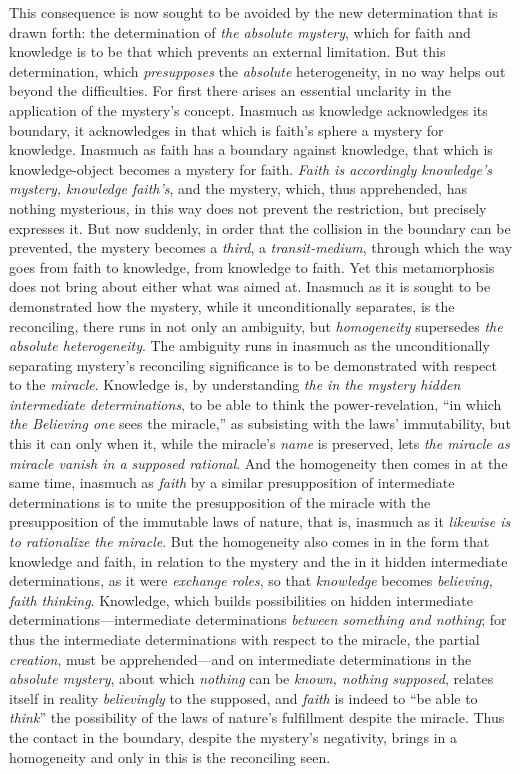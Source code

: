 \documentclass[12pt,a4paper]{book}
\begin{document}
This consequence is now sought to be avoided by the new determination that is drawn forth: the determination
of \emph{the absolute mystery}, which for faith and knowledge is to be that which prevents an external
limitation. But this determination, which \emph{presupposes} the \emph{absolute} heterogeneity, in no way helps out
beyond the difficulties. For first there arises an essential unclarity in the application of the mystery's
concept. Inasmuch as knowledge acknowledges its boundary, it acknowledges in that which is faith's sphere a
mystery for knowledge. Inasmuch as faith has a boundary against knowledge, that which is knowledge-object
becomes a mystery for faith. \emph{Faith is accordingly knowledge's mystery, knowledge faith's}, and the
mystery, which, thus apprehended, has nothing mysterious, in this way does not prevent the restriction, but
precisely expresses it. But now suddenly, in order that the collision in the boundary can be prevented, the
mystery becomes a \emph{third}, a \emph{transit-medium}, through which the way goes from faith to knowledge, from
knowledge to faith. Yet this metamorphosis does not bring about either what was aimed at. Inasmuch as it is
sought to be demonstrated how the mystery, while it unconditionally separates, is the reconciling, there runs
in not only an ambiguity, but \emph{homogeneity} supersedes \emph{the absolute heterogeneity}. The ambiguity runs in
inasmuch as the unconditionally separating mystery's reconciling significance is to be demonstrated with respect
to the \emph{miracle}. Knowledge is, by understanding \emph{the in the mystery hidden intermediate determinations}, to be
able to think the power-revelation, ``in which \emph{the Believing one} sees the miracle,'' as subsisting with the
laws' immutability, but this it can only when it, while the miracle's \emph{name} is preserved, lets \emph{the
miracle as miracle vanish in a supposed rational}. And the homogeneity then comes in at the same time, inasmuch
as \emph{faith} by a similar presupposition of intermediate determinations is to unite the presupposition of the
miracle with the presupposition of the immutable laws of nature, that is, inasmuch as it \emph{likewise is to
rationalize the miracle}. But the homogeneity also comes in in the form that knowledge and faith, in relation
to the mystery and the in it hidden intermediate determinations, as it were \emph{exchange roles}, so that
\emph{knowledge} becomes \emph{believing, faith thinking}. Knowledge, which builds possibilities on hidden
intermediate determinations---intermediate determinations \emph{between something and nothing}; for thus the
intermediate determinations with respect to the miracle, the partial \emph{creation}, must be apprehended---and on
intermediate determinations in the \emph{absolute mystery}, about which \emph{nothing} can be \emph{known, nothing supposed},
relates itself in reality \emph{believingly} to the supposed, and \emph{faith} is indeed to ``be able to \emph{think}'' the
possibility of the laws of nature's fulfillment despite the miracle. Thus the contact in the boundary, despite
the mystery's negativity, brings in a homogeneity and only in this is the reconciling seen.
\end{document}
